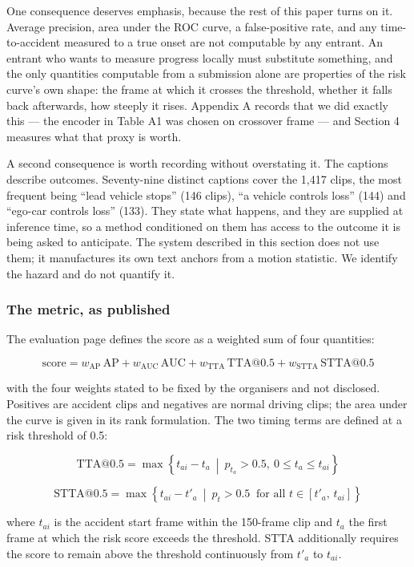 One consequence deserves emphasis, because the rest of this paper turns on it. Average precision, area under the ROC curve, a false-positive rate, and any time-to-accident measured to a true onset are not computable by any entrant. An entrant who wants to measure progress locally must substitute something, and the only quantities computable from a submission alone are properties of the risk curve's own shape: the frame at which it crosses the threshold, whether it falls back afterwards, how steeply it rises. Appendix A records that we did exactly this --- the encoder in Table A1 was chosen on crossover frame --- and Section 4 measures what that proxy is worth.

A second consequence is worth recording without overstating it. The captions describe outcomes. Seventy-nine distinct captions cover the 1,417 clips, the most frequent being ``lead vehicle stops'' (146 clips), ``a vehicle controls loss'' (144) and ``ego-car controls loss'' (133). They state what happens, and they are supplied at inference time, so a method conditioned on them has access to the outcome it is being asked to anticipate. The system described in this section does not use them; it manufactures its own text anchors from a motion statistic. We identify the hazard and do not quantify it.

\subsubsection{The metric, as published}
The evaluation page defines the score as a weighted sum of four quantities:

\[\text{score} = w_{\text{AP}}\,\text{AP} + w_{\text{AUC}}\,\text{AUC} + w_{\text{TTA}}\,\text{TTA@0.5} + w_{\text{STTA}}\,\text{STTA@0.5}\]

with the four weights stated to be fixed by the organisers and not disclosed. Positives are accident clips and negatives are normal driving clips; the area under the curve is given in its rank formulation. The two timing terms are defined at a risk threshold of 0.5:

\[\text{TTA@0.5} = \max\left\{ t_{ai} - t_{a} \ \middle|\ p_{t_{a}} > 0.5,\ 0 \leq t_{a} \leq t_{ai} \right\}\]

\[\text{STTA@0.5} = \max\left\{ t_{ai} - t'_{a} \ \middle|\ p_{t} > 0.5 \ \text{ for all } t \in [t'_{a},\,t_{ai}] \right\}\]

where \(t_{ai}\) is the accident start frame within the 150-frame clip and \(t_{a}\) the first frame at which the risk score exceeds the threshold. STTA additionally requires the score to remain above the threshold continuously from \(t'_{a}\) to \(t_{ai}\).


